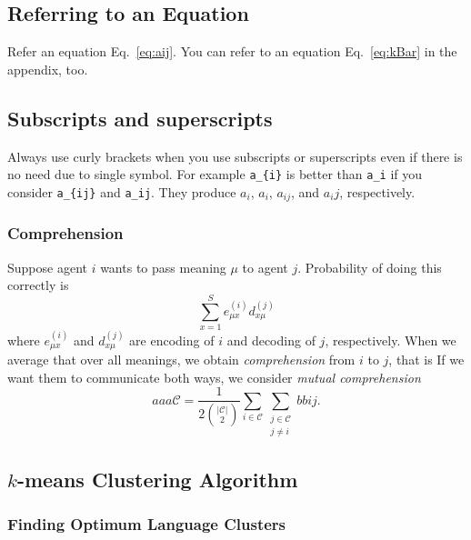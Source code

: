\documentclass[pre,twocolumn,showkeys,longbibliography]{revtex4-1}
\newcommand{\refeq}[1]{Eq.~\ref{#1}}
\newcommand{\hbAbs}[1]{| #1 |}	%
\newcommand{\hbSet}[1]{\mathcal{#1}}	%
\theoremstyle{plain}%
\theoremstyle{definition}
\theoremstyle{remark}
\begin{document}
\subsection{Referring to an Equation}

Refer an equation \refeq{eq:aij}.
You can refer to an equation \refeq{eq:kBar} in the appendix, too.




\subsection{Subscripts and superscripts}

Always use curly brackets when you use subscripts or superscripts 
even if there is no need due to single symbol.
For example \verb!a_{i}! is better than \verb!a_i! 
if you consider
\verb!a_{ij}! and \verb!a_ij!.
They produce
$a_{i}$,
$a_i$,
$a_{ij}$, and 
$a_ij$,
respectively.




\subsubsection{Comprehension}

Suppose agent $i$ wants to pass meaning $\mu$ to agent $j$.
Probability of doing this correctly is
\[
	\sum_{x = 1}^{S} 
		e_{\mu x}^{(i)}
		d_{x \mu}^{(j)} 
\]
where 
$e_{\mu x}^{(i)}$
and 
$d_{x \mu}^{(j)}$
are encoding of $i$ 
and decoding of $j$, 
respectively.
When we average that over all meanings,
we obtain \emph{comprehension} from $i$ to $j$, 
that is
If we want them to communicate both ways,
we consider \emph{mutual comprehension}
\[
	aaa{\hbSet{C}} = 	
	\frac{1}{2 {\hbAbs{\hbSet{C}} \choose 2}} 
	\sum_{i \in \hbSet{C}}
	\sum_{
		\substack{
			j \in \hbSet{C}\\
			j \neq i
		}
	} 
	{bb{i}{j}}.
\]





\subsection{$k$-means Clustering Algorithm}





\subsubsection{Finding Optimum Language Clusters}
\end{document}
